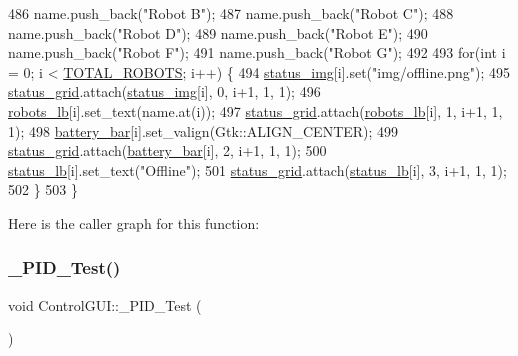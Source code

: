 \begin{DoxyCode}
486     name.push\_back(\textcolor{stringliteral}{"Robot B"});
487     name.push\_back(\textcolor{stringliteral}{"Robot C"});
488     name.push\_back(\textcolor{stringliteral}{"Robot D"});
489     name.push\_back(\textcolor{stringliteral}{"Robot E"});
490     name.push\_back(\textcolor{stringliteral}{"Robot F"});
491     name.push\_back(\textcolor{stringliteral}{"Robot G"});
492 
493     \textcolor{keywordflow}{for}(\textcolor{keywordtype}{int} i = 0; i < \hyperlink{class_control_g_u_i_a5a2c1a15c09444b56794705721ba73fa}{TOTAL\_ROBOTS}; i++) \{
494         \hyperlink{class_control_g_u_i_ac62b21acfde0d36a37b9838a00432295}{status\_img}[i].set(\textcolor{stringliteral}{"img/offline.png"});
495         \hyperlink{class_control_g_u_i_a9540bafb29ed9fb1c563a92a65617f10}{status\_grid}.attach(\hyperlink{class_control_g_u_i_ac62b21acfde0d36a37b9838a00432295}{status\_img}[i], 0, i+1, 1, 1);
496         \hyperlink{class_control_g_u_i_afc2b8ff626fa4298d6901807a7dfccf9}{robots\_lb}[i].set\_text(name.at(i));
497         \hyperlink{class_control_g_u_i_a9540bafb29ed9fb1c563a92a65617f10}{status\_grid}.attach(\hyperlink{class_control_g_u_i_afc2b8ff626fa4298d6901807a7dfccf9}{robots\_lb}[i], 1, i+1, 1, 1);
498         \hyperlink{class_control_g_u_i_ae56d3e863c1aa99cddec69324a676d8f}{battery\_bar}[i].set\_valign(Gtk::ALIGN\_CENTER);
499         \hyperlink{class_control_g_u_i_a9540bafb29ed9fb1c563a92a65617f10}{status\_grid}.attach(\hyperlink{class_control_g_u_i_ae56d3e863c1aa99cddec69324a676d8f}{battery\_bar}[i], 2, i+1, 1, 1);
500         \hyperlink{class_control_g_u_i_a99da3a90036061b9ab84323de2ae3bcf}{status\_lb}[i].set\_text(\textcolor{stringliteral}{"Offline"});
501         \hyperlink{class_control_g_u_i_a9540bafb29ed9fb1c563a92a65617f10}{status\_grid}.attach(\hyperlink{class_control_g_u_i_a99da3a90036061b9ab84323de2ae3bcf}{status\_lb}[i], 3, i+1, 1, 1);
502     \}
503 \}
\end{DoxyCode}
Here is the caller graph for this function\+:
\mbox{\label{class_control_g_u_i_a90dbd3d101fa49c6926e3cef452fb0a2}} 
\subsubsection{\texorpdfstring{\+\_\+\+P\+I\+D\+\_\+\+Test()}{\_PID\_Test()}}
{\footnotesize\ttfamily void Control\+G\+U\+I\+::\+\_\+\+P\+I\+D\+\_\+\+Test (\begin{DoxyParamCaption}{ }\end{DoxyParamCaption})}



